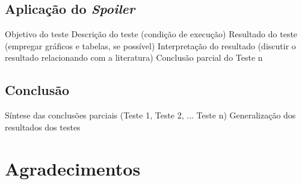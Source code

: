 \documentclass[
	article,			    %
	12pt,				    %
	oneside,			    %
	a4paper,			    %
	chapter=TITLE,		    %
	section=TITLE,		    %
	subsection=TITLE,	    %
	english,			    %
	brazil,				    %
	sumario=tradicional
]{abntex2}
\begin{document}
\subsection{Aplicação do \emph{Spoiler}}
Objetivo do teste
Descrição do teste (condição de execução)
Resultado do teste (empregar gráficos e tabelas, se possível)
Interpretação do resultado (discutir o resultado relacionando com a literatura)
Conclusão parcial do Teste n
\subsection{Conclusão}
Síntese das conclusões parciais (Teste 1, Teste 2, ... Teste n)
Generalização dos resultados dos testes

\postextual

\begin{apendicesenv}
\end{apendicesenv}
\begin{anexosenv}
\vspace{\onelineskip}
\end{anexosenv}
\section*{Agradecimentos}
\end{document}
